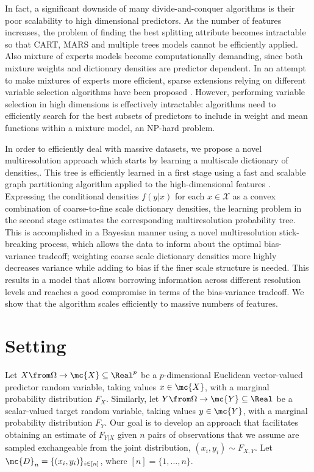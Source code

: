 In fact, a significant downside of many divide-and-conquer algorithms is their poor scalability to high dimensional predictors. As the number of features increases, the problem of finding the best splitting attribute becomes intractable so that CART, MARS and multiple trees models cannot be efficiently applied. Also mixture of experts models become computationally demanding, since both mixture weights and dictionary densities are predictor dependent. In an attempt to make mixtures of experts more efficient, sparse extensions relying on different variable selection algorithms have been proposed \cite{SparseMoF}. However, performing variable selection in high dimensions is effectively intractable: algorithms need to efficiently search for the best subsets of predictors to include in weight and mean functions within a mixture model, an NP-hard problem.

 In order to efficiently deal with massive datasets, we propose a novel multiresolution approach which starts by learning a multiscale dictionary of densities,. This tree is efficiently learned in a first stage using a fast and scalable graph partitioning algorithm applied to the high-dimensional features \cite{metis}.  Expressing the conditional densities $f(y|x)$ for each $x \in \mathcal{X}$ as a convex combination of coarse-to-fine scale dictionary densities, the learning problem in the second stage estimates the corresponding multiresolution probability tree.  This is accomplished in a Bayesian manner using a novel multiresolution stick-breaking process, which allows the data to inform about the optimal bias-variance tradeoff; weighting coarse scale dictionary densities more highly decreases variance while adding to bias if the finer scale structure is needed.  This results in a model that allows borrowing information across different resolution levels and reaches a good compromise in terms of the bias-variance tradeoff. We show that the algorithm scales efficiently to massive numbers of features. 


\section{Setting} \label{section:setting}
Let $X \from \Omega \to \mc{X} \subseteq \Real^p$ be a 
$p$-dimensional Euclidean vector-valued predictor random variable, taking values $x \in \mc{X}$, with a marginal probability distribution $F_X$.  
Similarly, let $Y \from \Omega \to \mc{Y} \subseteq \Real$ be a 
scalar-valued target random variable, taking values $y \in \mc{Y}$, with a marginal probability distribution $F_Y$.  Our goal is to develop an approach that facilitates obtaining an estimate of $F_{Y|X}$ given $n$ pairs of observations that we assume are sampled exchangeable from the joint distribution, $(x_i,y_i) \sim F_{X,Y}$. Let $\mc{D}_n=\{(x_i,y_i)\}_{i \in [n]}$, where $[n]=\{1,\ldots, n\}$.

